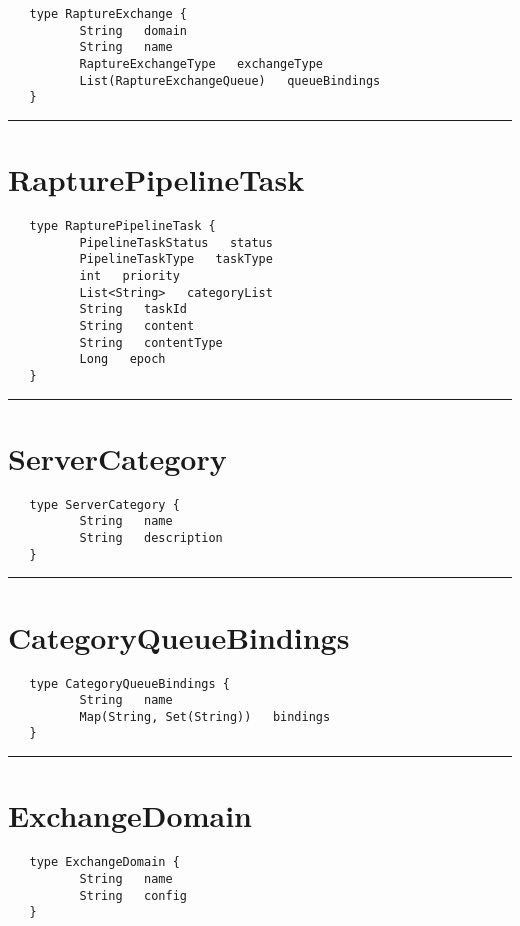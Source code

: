 \begin{Verbatim}
   type RaptureExchange {
          String   domain
          String   name
          RaptureExchangeType   exchangeType
          List(RaptureExchangeQueue)   queueBindings
   }
\end{Verbatim}

\rule{12cm}{2pt}
\section{RapturePipelineTask}
\label{type:RapturePipelineTask}

\begin{Verbatim}
   type RapturePipelineTask {
          PipelineTaskStatus   status
          PipelineTaskType   taskType
          int   priority
          List<String>   categoryList
          String   taskId
          String   content
          String   contentType
          Long   epoch
   }
\end{Verbatim}

\rule{12cm}{2pt}
\section{ServerCategory}
\label{type:ServerCategory}

\begin{Verbatim}
   type ServerCategory {
          String   name
          String   description
   }
\end{Verbatim}

\rule{12cm}{2pt}
\section{CategoryQueueBindings}
\label{type:CategoryQueueBindings}

\begin{Verbatim}
   type CategoryQueueBindings {
          String   name
          Map(String, Set(String))   bindings
   }
\end{Verbatim}

\rule{12cm}{2pt}
\section{ExchangeDomain}
\label{type:ExchangeDomain}

\begin{Verbatim}
   type ExchangeDomain {
          String   name
          String   config
   }
\end{Verbatim}

